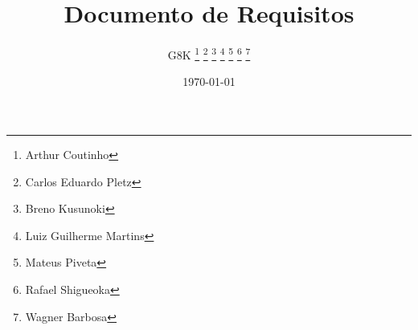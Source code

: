 \title{Documento de Requisitos}

\author{
  G8K 
  \thanks{Arthur Coutinho}
  \thanks{Carlos Eduardo Pletz}
  \thanks{Breno Kusunoki}
  \thanks{Luiz Guilherme Martins}
  \thanks{Mateus Piveta}
  \thanks{Rafael Shigueoka}
  \thanks{Wagner Barbosa}
}
\date{\today}
